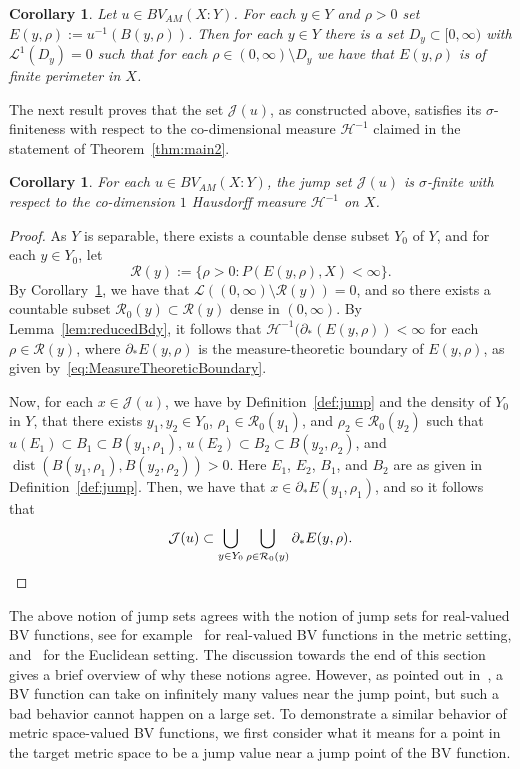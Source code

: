 \documentclass[11pt, letterpaper]{amsart} %
\DeclareMathOperator{\dist}{dist}
\numberwithin{equation}{section}
\theoremstyle{plain}
\newtheorem{corollary}[equation]{Corollary}
\theoremstyle{definition}
\begin{document}
{\begin{corollary}\label{cor:levelsets}
Let $u\in BV_{AM}(X:Y)$.  For each $y\in Y$ and $\rho>0$ set $E(y,\rho):=u^{-1}(B(y,\rho))$. 
Then for each $y\in Y$ there is a set $D_y\subset[0,\infty)$
with $\mathcal{L}^1(D_y)=0$ such that for each $\rho\in (0,\infty)\setminus D_y$ we have that $E(y,\rho)$ is of finite perimeter
in $X$.
\end{corollary}

The next result proves that the set $\mathcal{J}(u)$, as constructed above, satisfies its $\sigma$-finiteness
with respect to the co-dimensional measure $\mathcal{H}^{-1}$ claimed in the statement of Theorem~\ref{thm:main2}.

\begin{corollary}\label{cor:SigmaFinite}
For each $u\in BV_{AM}(X:Y)$, the jump set $\mathcal{J}(u)$ is 
$\sigma$-finite with respect to the co-dimension $1$ Hausdorff measure $\mathcal{H}^{-1}$ on $X$.
\end{corollary}

\begin{proof}
As $Y$ is separable, there exists a countable dense subset $Y_0$ of $Y$, and for each $y\in Y_0$, let 
\[
\mathcal{R}(y):=\{\rho>0: P(E(y,\rho),X)<\infty\}.
\]
By Corollary~\ref{cor:levelsets}, we have that $\mathcal{L}((0,\infty)\setminus\mathcal{R}(y))=0$, 
and so there exists a countable subset $\mathcal R_0(y)\subset\mathcal{R}(y)$ dense in $(0,\infty)$.  By Lemma~\ref{lem:reducedBdy}, it follows that $\mathcal{H}^{-1}(\partial_*(E(y,\rho))<\infty$ for each 
$\rho\in\mathcal{R}(y)$, where $\partial_*E(y,\rho)$ is the measure-theoretic boundary of $E(y,\rho)$, 
as given by~\eqref{eq:MeasureTheoreticBoundary}.

Now, for each $x\in\mathcal{J}(u)$, we have by Definition~\ref{def:jump} and the density of $Y_0$ in $Y$, that there exists $y_1,y_2\in Y_0$, $\rho_1\in\mathcal{R}_0(y_1)$, and $\rho_2\in\mathcal{R}_0(y_2)$ such that $u(E_1)\subset B_1\subset B(y_1,\rho_1)$, $u(E_2)\subset B_2\subset B(y_2,\rho_2)$, and $\dist(B(y_1,\rho_1),B(y_2,\rho_2))>0$.  Here $E_1$, $E_2$, $B_1$, and $B_2$ are as given in Definition~\ref{def:jump}.  Then, we have that $x\in\partial_* E(y_1,\rho_1)$, and so it follows that 
\[
\mathcal{J}(u)\subset\bigcup_{y\in Y_0}\bigcup_{\rho\in\mathcal{R}_0(y)}\partial_* E(y,\rho).\qedhere
\]   
\end{proof}

The above notion of jump sets agrees with the notion of jump sets for real-valued BV functions, see for 
example~\cite{Ambrosio, LSh1, EGLS} for real-valued BV functions in the metric setting, and~\cite{EvansGariepy}
for the Euclidean setting. The discussion towards the end of this section gives a brief overview of why these
notions agree.
However, as pointed out in~\cite{LSh1}, a BV function can take on infinitely many values
near the jump point, but such a bad behavior cannot happen on a large set. To demonstrate a similar behavior of
metric space-valued BV functions, we first consider what it means for a point in the target metric space to be a jump value
near a jump point of the BV function.

}
\end{document}
